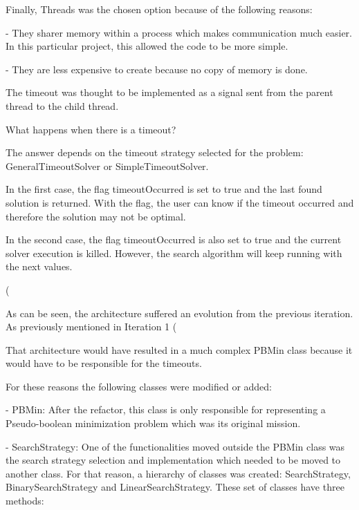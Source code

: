 Finally, Threads was the chosen option because of the following reasons: 

- They sharer memory within a process which makes communication much easier. In this particular project, this allowed the code to be more simple.  

- They are less expensive to create because no copy of memory is done.  



The timeout was thought to be implemented as a signal sent from the parent thread to the child thread.  



What happens when there is a timeout? 

The answer depends on the timeout strategy selected for the problem: GeneralTimeoutSolver or SimpleTimeoutSolver. 

In the first case, the flag timeoutOccurred is set to true and the last found solution is returned. With the flag, the user can know if the timeout occurred and therefore the solution may not be optimal.  

In the second case, the flag timeoutOccurred is also set to true and the current solver execution is killed. However, the search algorithm will keep running with the next values.  



(%



As can be seen, the architecture suffered an evolution from the previous iteration. As previously mentioned in Iteration 1 (%

That architecture would have resulted in a much complex PBMin class because it would have to be responsible for the timeouts.  



For these reasons the following classes were modified or added: 

- PBMin: After the refactor, this class is only responsible for representing a Pseudo-boolean minimization problem which was its original mission.  

- SearchStrategy: One of the functionalities moved outside the PBMin class was the search strategy selection and implementation which needed to be moved to another class. For that reason, a hierarchy of classes was created: SearchStrategy, BinarySearchStrategy and LinearSearchStrategy.  These set of classes have three methods: 

